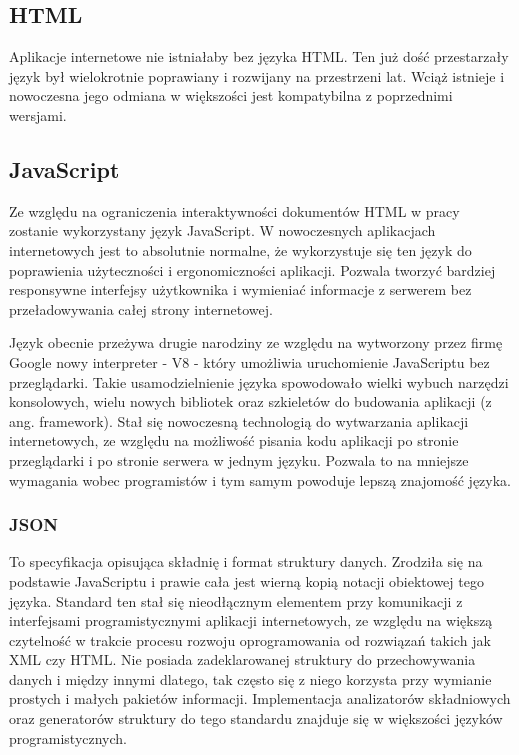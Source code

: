\subsection{HTML}
Aplikacje internetowe nie istniałaby bez języka HTML. Ten już dość przestarzały język był wielokrotnie poprawiany i rozwijany na przestrzeni lat. Wciąż istnieje i nowoczesna jego odmiana w większości jest kompatybilna z poprzednimi wersjami.

\subsection{JavaScript}
Ze względu na ograniczenia interaktywności dokumentów HTML w pracy zostanie wykorzystany język JavaScript. W nowoczesnych aplikacjach internetowych jest to absolutnie normalne, że wykorzystuje się ten język do poprawienia użyteczności i ergonomiczności aplikacji. Pozwala tworzyć bardziej responsywne interfejsy użytkownika i wymieniać informacje z serwerem bez przeładowywania całej strony internetowej.

Język obecnie przeżywa drugie narodziny ze względu na wytworzony przez firmę Google nowy interpreter - V8 - który umożliwia uruchomienie JavaScriptu bez przeglądarki. Takie usamodzielnienie języka spowodowało wielki wybuch narzędzi konsolowych, wielu nowych bibliotek oraz szkieletów do budowania aplikacji (z ang. framework). Stał się nowoczesną technologią do wytwarzania aplikacji internetowych, ze względu na możliwość pisania kodu aplikacji po stronie przeglądarki i po stronie serwera w jednym języku. Pozwala to na mniejsze wymagania wobec programistów i tym samym powoduje lepszą znajomość języka.



\subsubsection{JSON}
To specyfikacja opisująca składnię i format struktury danych. Zrodziła się na podstawie JavaScriptu i prawie cała jest wierną kopią notacji obiektowej tego języka.\cite{JsonWiki} Standard ten stał się nieodłącznym elementem przy komunikacji z interfejsami programistycznymi aplikacji internetowych, ze względu na większą czytelność w trakcie procesu rozwoju oprogramowania od rozwiązań takich jak XML czy HTML. Nie posiada zadeklarowanej struktury do przechowywania danych i między innymi dlatego, tak często się z niego korzysta przy wymianie prostych i małych pakietów informacji. Implementacja analizatorów składniowych oraz generatorów struktury do tego standardu znajduje się w większości języków programistycznych.

